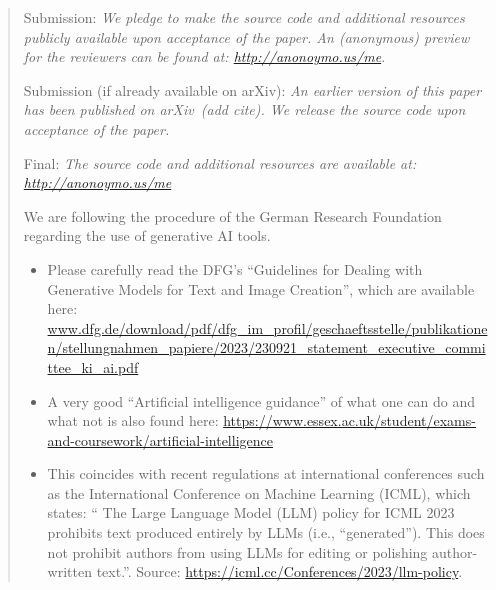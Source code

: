 \documentclass[sigconf, review, nonacm]{acmart}
\begin{document}
\begin{abstract}

Submission: \textit{We pledge to make the source code and additional resources publicly available upon acceptance of the paper.
An (anonymous) preview for the reviewers can be found at:
\url{http://anonoymo.us/me}.}

Submission (if already available on arXiv): \textit{An earlier version of this paper has been published on arXiv~(add cite). %
We release the source code upon acceptance of the paper.}

Final: \textit{The source code and additional resources are available at: \url{http://anonoymo.us/me}}

\begin{tcolorbox}[title=Note on the Use of Generative AI Tools]


We are following the procedure of the German Research Foundation regarding the use of generative AI tools.
%
\begin{itemize}
\item Please carefully read the DFG's ``Guidelines for Dealing with Generative Models for Text and Image Creation'', which are available here: 
\url{www.dfg.de/download/pdf/dfg_im_profil/geschaeftsstelle/publikationen/stellungnahmen_papiere/2023/230921_statement_executive_committee_ki_ai.pdf}

\item A very good ``Artificial intelligence guidance'' of what one can do and what not is also found here:
\url{https://www.essex.ac.uk/student/exams-and-coursework/artificial-intelligence}

\item This coincides with recent regulations at international conferences such as the International Conference on Machine Learning (ICML), which states: `` The Large Language Model (LLM) policy for ICML 2023 prohibits text produced entirely by LLMs (i.e., “generated”).  This does not prohibit authors from using LLMs for editing or polishing author-written text.''. Source: \url{https://icml.cc/Conferences/2023/llm-policy}.
\end{itemize}

\end{tcolorbox}


\end{abstract}
\end{document}
